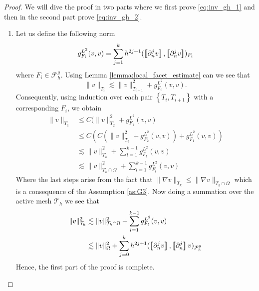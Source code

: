 \begin{proof}
    We will dive the proof in two parts where we first prove \eqref{eq:inv_gh_1} and then in the second part prove \eqref{eq:inv_gh_2}.
    \begin{enumerate}[label=\arabic*)]
        \item
            Let us define the following norm \[
            g_{F_{i}}^{L^{2}}( v,v)  = \sum_{j=1}^{k} h^{2j+1}( \jump{ \partial ^{j}_{n}v }, \jump{ \partial ^{j}_{n}v }    )_{F_{i} }
            \]
            where $F_{i} \in  \mathcal{F} ^{g}_{h}$. Using Lemma \ref{lemma:local_facet_estimate} can we see that \[
            \| v \|_{ T_{i} }^{  } \lesssim \| v \|_{ T_{i+1} }^{ 2 } + g_{F_{i}}^{L^{2}}( v,v).
            \]
    Consequently, using induction over each pair $\left\{ T_{i}, T_{i+1} \right\} $ with a corresponding $F_{i}$, we obtain
            \[
                \begin{split}
            \| v \|_{ T_{1} }^{  }  & \le  C( \| v \|_{ T_{2} }^{ 2 } + g_{F_{1}}^{L^{2}}( v,v)\\
              & \le  C( C( \| v \|_{ T_{3} }^{ 2 } + g_{F_{2}}^{L^{2}}( v,v) ) + g_{F_{1}}^{L^{2}}( v,v) )\\
              & \lesssim    \| v \|_{ T_{k} }^{ 2 }  + \sum_{l=1}^{k-1} g_{F_{l}}^{L^{2}}( v,v)  \\
              & \lesssim    \| v \|_{ T_{k} \cap \Omega  }^{ 2 }  + \sum_{l=1}^{k-1} g_{F_{l}}^{L^{2}}( v,v)
                \end{split}
            \]
            Where the last steps arise from the fact that $\| \nabla v \|_{ T_{k} }^{  } \le \| \nabla v \|_{ T_{k} \cap \Omega  }^{  }  $ which is a consequence of the Assumption \ref{as:G3}.
             Now doing a summation over the active mesh $\mathcal{T} _{h}$ we see that \[
                \begin{split}
                    \| v \|_{ \mathcal{T} _{h} }^{2  } &\lesssim \| v \|_{ \mathcal{T} _{h}\cap \Omega  }^{2  }+ \sum_{l=1}^{k-1} g_{F_{l}}^{L^{2}}( v,v) \\
                     &\lesssim \| v \|_{ \Omega  }^{ 2 }  + \sum_{j=0}^{k} h^{2j+1} ( \jump{ \partial ^{j}_{n} v }, \jump{ \partial ^{j}_{n} }  v  )_{\mathcal{F}_{h}^{g}}
                \end{split}
        \]
        Hence, the first part of the proof is complete.


\end{enumerate}
\end{proof}
